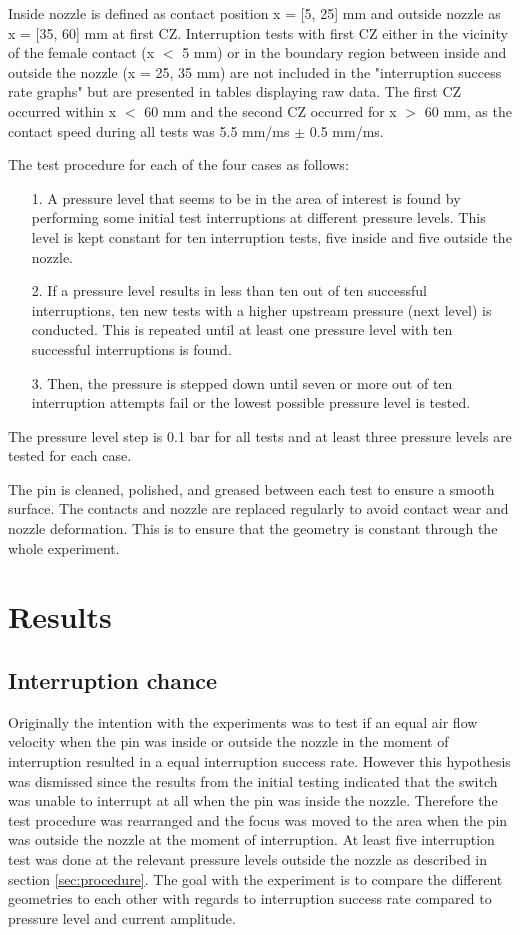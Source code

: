 \documentclass[10pt,a4paper]{article}
\begin{document}
Inside nozzle is defined as contact position x = [5, 25] mm and outside nozzle as x = [35, 60] mm at first CZ. Interruption tests with first CZ either in the vicinity of the female contact (x $<$ 5 mm) or in the boundary region between inside and outside the nozzle (x = 25, 35 mm) are not included in the "interruption success rate graphs" but are presented in tables displaying raw data. The first CZ occurred within x $<$ 60 mm and the second CZ occurred for x $>$ 60 mm, as the contact speed during all tests was 5.5 mm/ms $\pm$ 0.5 mm/ms.

The test procedure for each of the four cases as follows: 
\begin{itemize}
\item[1.] A pressure level that seems to be in the area of interest is found by performing some initial test interruptions at different pressure levels. This level is kept constant for ten interruption tests, five inside and five outside the nozzle.
\item[2.] If a pressure level results in less than ten out of ten successful interruptions, ten new tests with a higher upstream pressure (next level) is conducted. This is repeated until at least one pressure level with ten successful interruptions is found.
\item[3.] Then, the pressure is stepped down until seven or more out of ten interruption attempts fail or the lowest possible pressure level is tested.
\end{itemize}

The pressure level step is 0.1 bar for all tests and at least three pressure levels are tested for each case.\newline

The pin is cleaned, polished, and greased between each test to ensure a smooth surface. The contacts and nozzle are replaced regularly to avoid contact wear and nozzle deformation. This is to ensure that the geometry is constant through the whole experiment.

\section{Results}
\subsection{Interruption chance} \label{sec:interChance}
Originally the intention with the experiments was to test if an equal air flow velocity when the pin was inside or outside the nozzle in the moment of interruption resulted in a equal interruption success rate. However this hypothesis was dismissed since the results from the initial testing indicated that the switch was unable to interrupt at all when the pin was inside the nozzle. Therefore the test procedure was rearranged and the focus was moved to the area when the pin was outside the nozzle at the moment of interruption. At least five interruption test was done at the relevant pressure levels outside the nozzle as described in section \ref{sec:procedure}. The goal with the experiment is to compare the different geometries to each other with regards to interruption success rate compared to pressure level and current amplitude.
\end{document}
